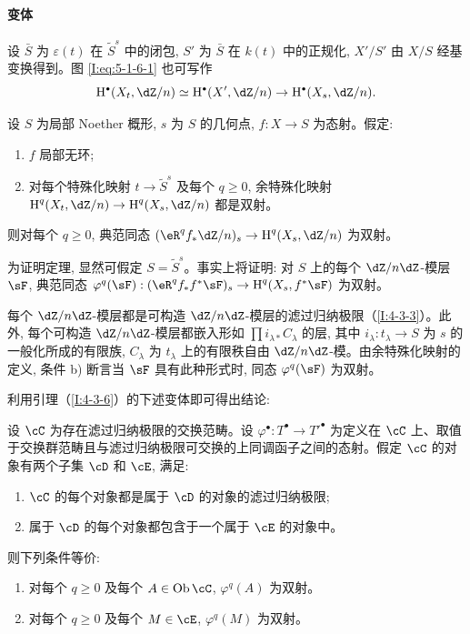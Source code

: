 \paragraph{变体}
设 $\bar S$ 为 $\varepsilon(t)$ 在 $\widetilde S^s$ 中的闭包, $S'$ 为 $\bar S$ 在 $k(t)$ 中的正规化, $X'/S'$ 由 $X/S$ 经基变换得到。图 \eqref{I:eq:5-1-6-1} 也可写作
\[
  \h^\bullet(X_t,\dZ/n) \simeq \h^\bullet(X',\dZ/n) \to \h^\bullet(X_s,\dZ/n) \text{.}
\]

\begin{theorem}\label{I:5-1-7}
设 $S$ 为局部 Noether 概形, $s$ 为 $S$ 的几何点, $f:X\to S$ 为态射。假定:
\begin{enumerate}[\indent a)]
  \item $f$ 局部无环;
  \item 对每个特殊化映射 $t\to\widetilde S^s$ 及每个 $q\geqslant0$, 余特殊化映射 $\h^q(X_t,\dZ/n)\to\h^q(X_s,\dZ/n)$ 都是双射。
\end{enumerate}
则对每个 $q\geqslant0$, 典范同态 $(\eR^qf_*\dZ/n)_s\to\h^q(X_s,\dZ/n)$ 为双射。
\end{theorem}

为证明定理, 显然可假定 $S=\widetilde S^s$。事实上将证明: 对 $S$ 上的每个 $\dZ/n\dZ$-模层 $\sF$, 典范同态 $\varphi^q(\sF):(\eR^qf_*f^*\sF)_s\to\h^q(X_s,f^*\sF)$ 为双射。

每个 $\dZ/n\dZ$-模层都是可构造 $\dZ/n\dZ$-模层的滤过归纳极限（\ref{I:4-3-3}）。此外, 每个可构造 $\dZ/n\dZ$-模层都嵌入形如 $\prod i_{\lambda *}C_\lambda$ 的层, 其中 $i_\lambda:t_\lambda\to S$ 为 $s$ 的一般化所成的有限族, $C_\lambda$ 为 $t_\lambda$ 上的有限秩自由 $\dZ/n\dZ$-模。由余特殊化映射的定义, 条件 b) 断言当 $\sF$ 具有此种形式时, 同态 $\varphi^q(\sF)$ 为双射。

利用引理（\ref{I:4-3-6}）的下述变体即可得出结论:

\begin{lemma}\label{I:5-1-8}
设 $\cC$ 为存在滤过归纳极限的交换范畴。设 $\varphi^\bullet:T^\bullet\to{T'}^\bullet$ 为定义在 $\cC$ 上、取值于交换群范畴且与滤过归纳极限可交换的上同调函子之间的态射。假定 $\cC$ 的对象有两个子集 $\cD$ 和 $\cE$, 满足:
\begin{enumerate}[\indent a)]
  \item $\cC$ 的每个对象都是属于 $\cD$ 的对象的滤过归纳极限;
  \item 属于 $\cD$ 的每个对象都包含于一个属于 $\cE$ 的对象中。
\end{enumerate}
则下列条件等价:
\begin{enumerate}[\indent (i)]
  \item 对每个 $q\geqslant0$ 及每个 $A\in\ob\cC$, $\varphi^q(A)$ 为双射。
  \item 对每个 $q\geqslant0$ 及每个 $M\in\cE$, $\varphi^q(M)$ 为双射。
\end{enumerate}
\end{lemma}

